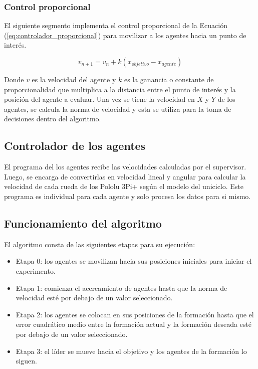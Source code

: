 \subsubsection{Control proporcional}
El siguiente segmento implementa el control proporcional de la Ecuación (\ref{eq:controlador_proporcional}) para movilizar a los agentes hacia un punto de interés.

\begin{equation}
	v_{n+1} = v_n + k(x_{objetivo} - x_{agente})
	\label{eq:controlador_proporcional}
\end{equation}

Donde $v$ es la velocidad del agente y $k$ es la ganancia o constante de proporcionalidad que multiplica a la distancia entre el punto de interés y la posición del agente a evaluar. Una vez se tiene la velocidad en $X$ y $Y$ de los agentes, se calcula la norma de velocidad y esta se utiliza para la toma de decisiones dentro del algoritmo.

\subsection{Controlador de los agentes}
El programa del los agentes recibe las velocidades calculadas por el supervisor. Luego, se encarga de convertirlas en velocidad lineal y angular para calcular la velocidad de cada rueda de los Pololu 3Pi+ según el modelo del uniciclo. Este programa es individual para cada agente y solo procesa los datos para si mismo.

\subsection{Funcionamiento del algoritmo}
El algoritmo consta de las siguientes etapas para su ejecución:
\begin{itemize}
	\item Etapa 0: los agentes se movilizan hacia sus posiciones iniciales para iniciar el experimento.
	\item Etapa 1: comienza el acercamiento de agentes hasta que la norma de velocidad esté por debajo de un valor seleccionado.
	\item Etapa 2: los agentes se colocan en sus posiciones de la formación hasta que el error cuadrático medio entre la formación actual y la formación deseada esté por debajo de un valor seleccionado.
	\item Etapa 3: el líder se mueve hacia el objetivo y los agentes de la formación lo siguen.
\end{itemize}

